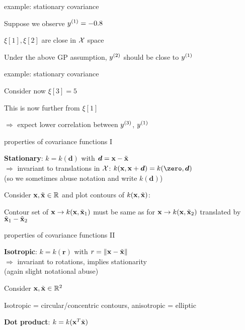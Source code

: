 \documentclass[11pt,compress,t,notes=noshow, xcolor=table]{beamer}
\begin{document}
\begin{framei}{example: stationary covariance} 
\item Suppose we observe $\yi[1] = -0.8$ 
\item $\xi[1], \xi[2]$ are close in $\Xspace$ space 
\item Under the above GP assumption, $\yi[2]$ should be close to $\yi[1]$ 
\vfill 
{} 
\end{framei} 

\begin{framei}{example: stationary covariance} 
\item Consider now $\xi[3] = 5$ 
\item This is now further from $\xi[1]$
\item $\Rightarrow$ expect lower correlation between $\yi[3]$, $\yi[1]$ 
\vfill 
{} 
\end{framei}


\begin{framei}[sep=L]{properties of covariance functions I}
\item \textbf{Stationary}: $k = k(\bm{d})$ with $\bm{d} = \xv - \xtil$ \\
$\Rightarrow$ invariant to translations in $\Xspace$: $k(\xv, \xv + \bm{d}) = k(\zero, \bm{d})$\\
(so we sometimes abuse notation and write $k(\bm{d})$)
\item Consider $\xv, \xtil \in \mathbb{R}$ and plot contours of $k(\xv,\xtil)$: 
\item Contour set of $\xv \to k(\xv,\xtil_1)$ must be same as for $\xv \to k(\xv, \xtil_2)$ translated by $\xtil_1-\xtil_2$
\end{framei}

\begin{framei}[sep=L]{properties of covariance functions II}
\item \textbf{Isotropic}: $k = k(\bm{r})$ with $r = \xxtnorm$ \\
$\Rightarrow$ invariant to rotations, implies stationarity\\
(again slight notational abuse)
\item Consider $\xv, \xtil \in \mathbb{R}^2$
\item Isotropic = circular/concentric contours, anisotropic = elliptic
\item \textbf{Dot product}: $k = k(\xv^T \xtil)$
\end{framei}
\end{document}
